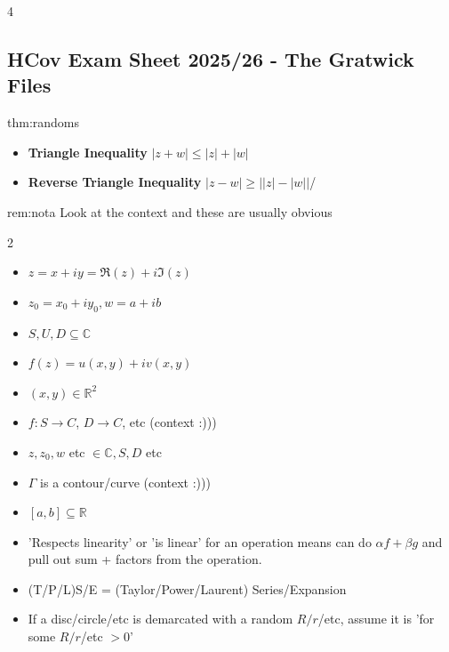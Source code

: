 \documentclass[landscape, 8pt]{extarticle}
\begin{document}
\fontsize{5pt}{6pt} \selectfont
	
	\setlength{\abovedisplayskip}{0pt}
	\setlength{\belowdisplayskip}{0pt}
	\setlength{\abovedisplayshortskip}{0pt}
	\setlength{\belowdisplayshortskip}{0pt}
	
	\begin{multicols*}{4}
		\raggedcolumns 
		\vspace{-5pt}
		\subsection*{HCov Exam Sheet 2025/26 - The Gratwick Files}
		\vspace{-5pt}
		\begin{thm}{thm:randoms}{ }
			\begin{itemize}
				\item \textbf{Triangle Inequality} $\left|z + w\right| \le \left|z\right| + \left|w\right|$
				\item \textbf{Reverse Triangle Inequality} $\left| z - w\right| \ge \left|\left|z\right| - \left|w\right|\right|$/
			\end{itemize}
		\end{thm}
		
		
		\begin{rem}[Notation]{rem:nota}{ }
			Look at the context and these are usually obvious 
			\vspace{-10pt}
			\begin{multicols}{2}
				\begin{itemize}
					\item $z = x+iy = \Re(z) + i \Im(z)$
					\item $z_0 = x_0+iy_0, w = a+ib$
					\item $S, U, D \subseteq \mathbb{C}$
					\item $f(z) = u(x, y) + iv(x, y)$
					\item $(x, y) \in \mathbb{R}^2$
					\item $f: S \to C$, $D \to C$, etc (context :)))
					\item $z, z_0, w$ etc $\in \mathbb{C}, S, D$ etc
					\item $\Gamma$ is a contour/curve (context :)))
					\item $[a, b] \subseteq \mathbb{R}$
					\item 'Respects linearity' or 'is linear' for an operation means can do $\alpha f + \beta g$ and pull out sum + factors from the operation.
					\item (T/P/L)S/E = (Taylor/Power/Laurent) Series/Expansion
					\item If a disc/circle/etc is demarcated with a random $R/r$/etc, assume it is 'for some $R/r$/etc $>0$'
				\end{itemize}
			\end{multicols}
			

\end{rem}
\end{multicols*}
\end{document}
